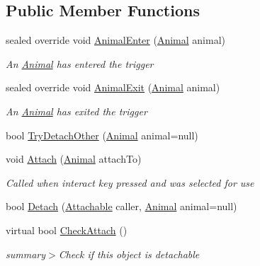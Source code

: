 \subsection*{Public Member Functions}
\begin{DoxyCompactItemize}
\item 
sealed override void \mbox{\hyperlink{class_attachable_a78b678ddd2860e245fd1ce5350414b8e}{Animal\+Enter}} (\mbox{\hyperlink{class_animal}{Animal}} animal)
\begin{DoxyCompactList}\small\item\em An \mbox{\hyperlink{class_animal}{Animal}} has entered the trigger \end{DoxyCompactList}\item 
sealed override void \mbox{\hyperlink{class_attachable_adef6aa1287071d15d2724de7c0badbd8}{Animal\+Exit}} (\mbox{\hyperlink{class_animal}{Animal}} animal)
\begin{DoxyCompactList}\small\item\em An \mbox{\hyperlink{class_animal}{Animal}} has exited the trigger \end{DoxyCompactList}\item 
bool \mbox{\hyperlink{class_attachable_ad8e67a23808330a401d6cf95f30d4ead}{Try\+Detach\+Other}} (\mbox{\hyperlink{class_animal}{Animal}} animal=null)
\item 
void \mbox{\hyperlink{class_attachable_a4d8883f6f87f40cbe09ef20e50f84975}{Attach}} (\mbox{\hyperlink{class_animal}{Animal}} attach\+To)
\begin{DoxyCompactList}\small\item\em Called when interact key pressed and was selected for use\end{DoxyCompactList}\item 
bool \mbox{\hyperlink{class_attachable_a85cfa28ce6929e32b158c067b0421e7d}{Detach}} (\mbox{\hyperlink{class_attachable}{Attachable}} caller, \mbox{\hyperlink{class_animal}{Animal}} animal=null)
\item 
virtual bool \mbox{\hyperlink{class_attachable_ab48b28f7aaf8a83d7b38d68c60ed1eff}{Check\+Attach}} ()
\begin{DoxyCompactList}\small\item\em summary$>$Check if this object is detachable\end{DoxyCompactList}\end{DoxyCompactItemize}

